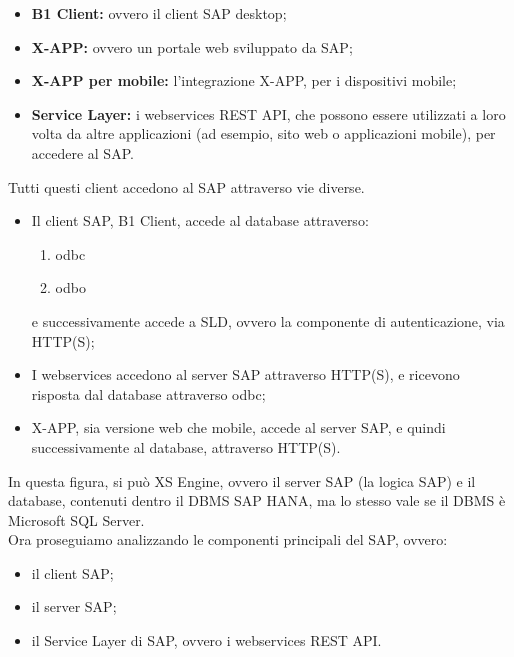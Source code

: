 \begin{itemize}
	\item \textbf{B1 Client:} ovvero il client SAP desktop;
	\item \textbf{X-APP:} ovvero un portale web sviluppato da SAP;
	\item \textbf{X-APP per mobile:} l'integrazione X-APP, per i dispositivi mobile;
	\item \textbf{Service Layer:} i webservices REST API, che possono essere utilizzati a loro volta da altre applicazioni (ad esempio, sito web o applicazioni mobile), per accedere al SAP.
\end{itemize}
Tutti questi client accedono al SAP attraverso vie diverse.
\begin{itemize}
		\item Il client SAP, B1 Client, accede al database attraverso:
		\begin{enumerate}
			\item \gls{odbc} 
			\item \gls{odbo}
		\end{enumerate}
		e successivamente accede a SLD, ovvero la componente di autenticazione, via HTTP(S);
\item I webservices accedono al server SAP attraverso HTTP(S), e ricevono risposta dal database attraverso \gls{odbc};
	\item X-APP, sia versione web che mobile, accede al server SAP, e quindi successivamente al database, attraverso HTTP(S).
\end{itemize}
In questa figura, si può XS Engine, ovvero il server SAP (la logica SAP) e il database, contenuti dentro il DBMS SAP HANA, ma lo stesso vale se il DBMS è Microsoft SQL Server.\\
Ora proseguiamo analizzando le componenti principali del SAP, ovvero:
\begin{itemize}
	\item il client SAP;
	\item il server SAP;
	\item il Service Layer di SAP, ovvero i webservices REST API.
\end{itemize}
\newpage
